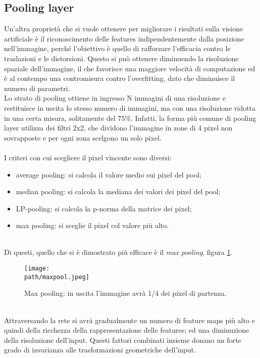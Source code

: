 \subsection{Pooling layer}
\label{subsec:pooling}
Un'altra proprietà che si vuole ottenere per migliorare i risultati sulla visione artificiale è il riconoscimento delle features indipendentemente dalla posizione nell'immagine, perché
l'obiettivo è quello di rafforzare l'efficacia contro le
traslazioni e le distorsioni. Questo si può ottenere diminuendo la risoluzione spaziale dell'immagine, il che favorisce una maggiore velocità di computazione ed è al contempo una contromisura contro l'overfitting, dato che diminuisce il numero di parametri.\\ 
Lo strato di pooling ottiene in ingresso N immagini di una risoluzione e restituisce in uscita lo stesso numero di immagini, ma con una risoluzione ridotta in una certa misura, solitamente del $75\%$. Infatti, la forma più comune di pooling layer utilizza dei filtri 2x2, che dividono l'immagine in zone di 4 pixel non sovrapposte e per ogni zona scelgono un solo pixel. \\
\\
I criteri con cui scegliere il pixel vincente sono diversi:
\begin{itemize}
\item average pooling: si calcola il valore medio sui pixel del pool;
\item median pooling: si calcola la mediana dei valori dei pixel del pool;
\item LP-pooling: si calcola la p-norma della matrice dei pixel;
\item max pooling: si sceglie il pixel col valore più alto.
\end{itemize}
\\
Di questi, quello che si è dimostrato più efficace è il \emph{max pooling}, figura \ref{fig:maxpool}.
\begin{figure}[h!]
 \centering
 \texttt{[image: \\path/maxpool.jpeg]} 
 \caption{Max pooling: in uscita l'immagine avrà 1/4 dei pixel di partenza.}
 \label{fig:maxpool}
\end{figure}
\\
Attraversando la rete si avrà gradualmente un numero di feature maps  più alto e quindi della ricchezza della rappresentazione delle features; ed una diminuzione della risoluzione dell'input. Questi fattori combinati insieme donano un forte grado di invarianza alle trasformazioni geometriche dell'input.
 
